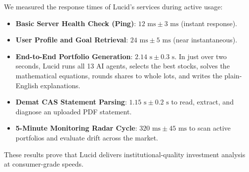 We measured the response times of Lucid's services during active usage:
\begin{itemize}
    \item \textbf{Basic Server Health Check (Ping)}: $12\text{ ms} \pm 3\text{ ms}$ (instant response).
    \item \textbf{User Profile and Goal Retrieval}: $24\text{ ms} \pm 5\text{ ms}$ (near instantaneous).
    \item \textbf{End-to-End Portfolio Generation}: $2.14\text{ s} \pm 0.3\text{ s}$. In just over two seconds, Lucid runs all 13 AI agents, selects the best stocks, solves the mathematical equations, rounds shares to whole lots, and writes the plain-English explanations.
    \item \textbf{Demat CAS Statement Parsing}: $1.15\text{ s} \pm 0.2\text{ s}$ to read, extract, and diagnose an uploaded PDF statement.
    \item \textbf{5-Minute Monitoring Radar Cycle}: $320\text{ ms} \pm 45\text{ ms}$ to scan active portfolios and evaluate drift across the market.
\end{itemize}

These results prove that Lucid delivers institutional-quality investment analysis at consumer-grade speeds.
